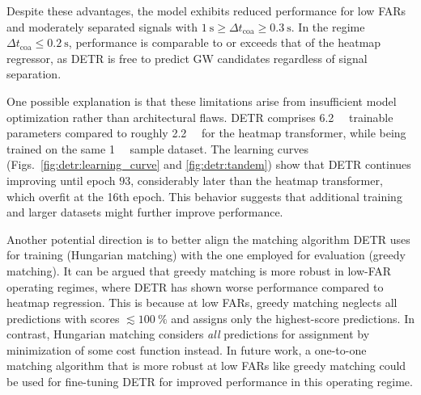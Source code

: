 
Despite these advantages, the model exhibits reduced performance for low FARs and moderately separated signals with $\SI{1}{\second}\geq\Delta t_\text{coa}\geq\SI{0.3}{\second}$. 
In the regime $\Delta t_\text{coa}\leq\SI{0.2}{\second}$, performance is comparable to or exceeds that of the heatmap regressor, as DETR is free to predict GW candidates regardless of signal separation.

One possible explanation is that these limitations arise from insufficient model optimization rather than architectural flaws. DETR comprises \SI{6.2}{\mega\nothing} trainable parameters compared to roughly \SI{2.2}{\mega\nothing} for the heatmap transformer, while being trained on the same \SI{1}{\mega\nothing} sample dataset. The learning curves (Figs.~\ref{fig:detr:learning_curve} and \ref{fig:detr:tandem}) show that DETR continues improving until epoch $93$, considerably later than the heatmap transformer, which overfit at the 16th epoch. This behavior suggests that additional training and larger datasets might further improve performance.


Another potential direction is to better align the matching algorithm DETR uses for training (Hungarian matching) with the one employed for evaluation (greedy matching). It can be argued that greedy matching is more robust in low-FAR operating regimes, where DETR has shown worse performance compared to heatmap regression. This is because at low FARs, greedy matching neglects all predictions with scores $\lesssim\SI{100}{\percent}$ and assigns only the highest-score predictions. In contrast, Hungarian matching considers \emph{all} predictions for assignment by minimization of some cost function instead. 
In future work, a one-to-one matching algorithm that is more robust at low FARs like greedy matching could be used for fine-tuning DETR for improved performance in this operating regime.